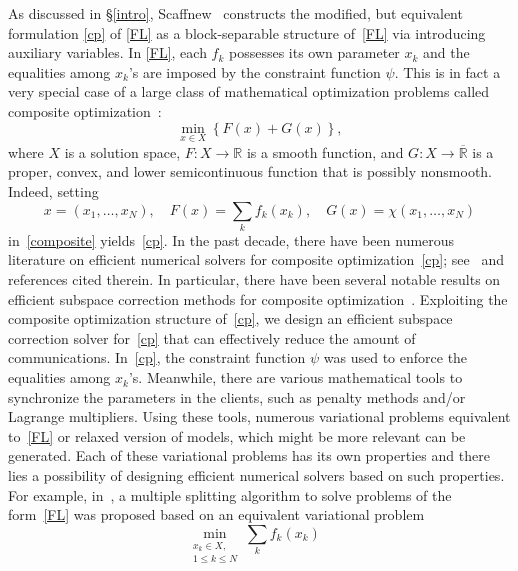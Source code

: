 \begin{itemize}
As discussed in \S \ref{intro}, Scaffnew~\cite{mishchenko2022proxskip} constructs the modified, but equivalent formulation \cref{cp} of \cref{FL} as a block-separable structure of~\cref{FL} via introducing auxiliary variables. In \cref{FL}, each $f_k$ possesses its own parameter $x_k$ and the equalities among $x_k$'s are imposed by the constraint function $\psi$. This is in fact a very special case of a large class of mathematical optimization problems called composite optimization~\cite{Nesterov:2013}:
\begin{equation}
    \label{composite}
    \min_{x \in X} \left\{ F(x) + G(x) \right\},
\end{equation}
where $X$ is a solution space, $F \colon X \rightarrow \mathbb{R}$ is a smooth function, and $G \colon X \rightarrow \overline{\mathbb{R}}$ is a proper, convex, and lower semicontinuous function that is possibly nonsmooth.
Indeed, setting
\begin{equation*}
    x = (x_1, \dots, x_N), \quad
    F(x) = \sum_{k} f_k (x_k), \quad
    G(x) = \chi (x_1, \dots, x_N)
\end{equation*}
in~\cref{composite} yields~\cref{cp}. In the past decade, there have been numerous literature on efficient numerical solvers for composite optimization~\cref{cp}; see~\cite{CP:2016,Nesterov:2013,Teboulle:2018} and references cited therein. In particular, there have been several notable results on efficient subspace correction methods for composite optimization~\cite{Park:2021,Park:2022}. Exploiting the composite optimization structure of~\cref{cp}, we design an efficient subspace correction solver for~\cref{cp} that can effectively reduce the amount of communications. In~\cref{cp}, the constraint function $\psi$ was used to enforce the equalities among $x_k$'s. Meanwhile, there are various mathematical tools to synchronize the parameters in the clients, such as penalty methods and/or Lagrange multipliers. Using these tools, numerous variational problems equivalent to~\cref{FL} or relaxed version of models, which might be more relevant can be generated. Each of these variational problems has its own properties and there lies a possibility of designing efficient numerical solvers based on such properties. For example, in~\cite{GM:2012}, a multiple splitting algorithm to solve problems of the form~\cref{FL} was proposed based on an equivalent variational problem
\begin{equation*}
    \min_{\substack{x_k \in X,\\ 1 \leq k \leq N}} \sum_k f_k (x_k) \quad

\end{equation*}
\end{itemize}
